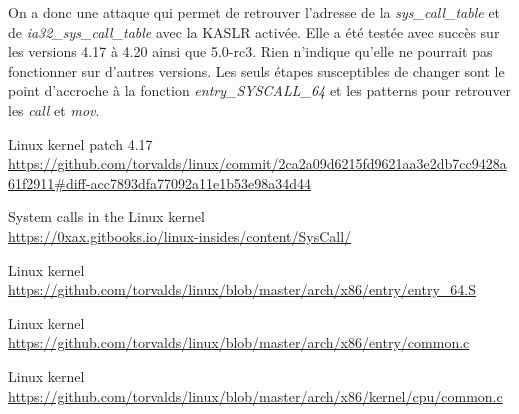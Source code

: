 \documentclass[journal, a4paper]{IEEEtran}
\begin{document}
On a donc une attaque qui permet de retrouver l'adresse de la \textit{sys\_call\_table} et de \textit{ia32\_sys\_call\_table} avec la KASLR activée. Elle a été testée avec succès sur les versions 4.17 à 4.20 ainsi que 5.0-rc3. Rien n'indique qu'elle ne pourrait pas fonctionner sur d'autres versions. Les seuls étapes susceptibles de changer sont le point d'accroche à la fonction \textit{entry\_SYSCALL\_64} et les patterns pour retrouver les \textit{call} et \textit{mov}. 
\begin{thebibliography}{}
	Linux kernel patch 4.17\\
	\url{https://github.com/torvalds/linux/commit/2ca2a09d6215fd9621aa3e2db7cc9428a61f2911#diff-acc7893dfa77092a11e1b53e98a34d44}

	System calls in the Linux kernel\\
	\url{https://0xax.gitbooks.io/linux-insides/content/SysCall/}

	Linux kernel\\
	\url{https://github.com/torvalds/linux/blob/master/arch/x86/entry/entry_64.S}

	Linux kernel\\
	\url{https://github.com/torvalds/linux/blob/master/arch/x86/entry/common.c}

	Linux kernel\\
	\url{https://github.com/torvalds/linux/blob/master/arch/x86/kernel/cpu/common.c}
\end{thebibliography}
\end{document}
